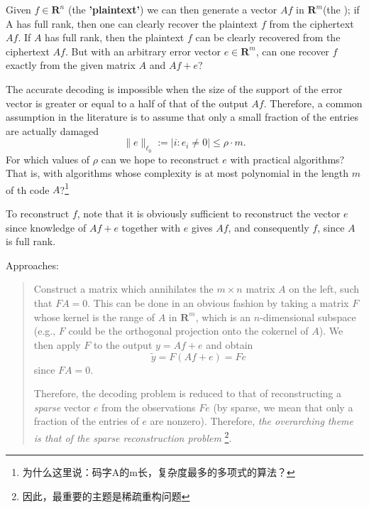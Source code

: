 Given $f \in \mathbf{R}^n$ (the \textbf{'plaintext'}) we can then generate a vector $Af$ in $\mathbf{R}^m$(the ); if A has \textcolor[rgb]{1,0,0}{full rank}, then one can clearly recover the plaintext $f$ from the ciphertext $Af$. If $A$ has full rank, then the plaintext $f$ can be clearly recovered from the ciphertext $Af$. But with an arbitrary error vector $e \in \mathbf{R}^m$, can one recover $f$ exactly from the given matrix $A$ and $Af+e$?

The accurate decoding is impossible when the size of the support of the error vector is greater or equal to a half of that of the output $Af$. Therefore, a common assumption in the literature is to assume that only a small fraction of the entries are actually damaged 
\begin{equation}
    \|e\|_{\ell_0} := |{i : e_i \neq 0}| \leq \rho \cdot m.
    \label{eq5.1.1}
\end{equation}
For which values of $\rho$ can we hope to reconstruct $e$ with practical algorithms? That is, with algorithms whose complexity is at most \textcolor[rgb]{1,0,0}{polynomial} in the length $m$ of th code $A$?\footnote{为什么这里说：码字A的m长，复杂度最多的多项式的算法？}

To reconstruct $f$, \textcolor[rgb]{1,0,0}{note} that it is obviously sufficient to reconstruct the vector $e$ since knowledge of $Af+e$ together with $e$ gives $Af$, and consequently $f$, since $A$ is \textcolor[rgb]{1,0,0}{full rank}. 

Approaches:
\begin{quote}
    Construct a matrix which annihilates the $m \times n$ matrix $A$ on the left, such that $FA=0$. This can be done in an obvious fashion by taking a matrix $F$ whose \textcolor[rgb]{1,0,0}{kernel} is the range of $A$ in $\mathbf{R}^m$, which is an $n$-dimensional subspace (e.g., $F$ could be the \textcolor[rgb]{1,0,0}{orthogonal projection onto the cokernel of $A$}). We then apply $F$ to the output $y=Af+e$ and obtain
    \begin{equation}
        \tilde{y}=F(Af+e)=Fe
        \label{eq5.1.2}
    \end{equation}
    since $FA=0$.

    Therefore, the decoding problem is reduced to \textcolor[rgb]{1,0,0}{that of reconstructing a \emph{sparse} vector $e$ from the observations $Fe$} (by sparse, we mean that only a fraction of the entries of $e$ are nonzero). Therefore, \emph{the overarching theme is that of the sparse reconstruction problem} \footnote{因此，最重要的主题是稀疏重构问题}.
\end{quote}


